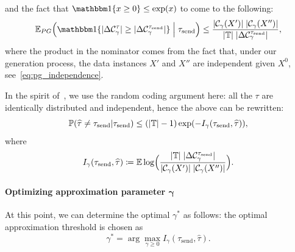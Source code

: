 and the fact that $\Ind\{x \ge 0\} \le \exp(x)$ to come to the following:
\begin{equation}
  \Expct_{PG}
      \Bigl(
        \Ind\{|\Delta \mathcal{C}_\gamma^\tau| \ge |\Delta \mathcal{C}_\gamma^{\tau_\text{send}}|\} \Bigm| \tau_\text{send}
      \Bigr)
      \le
      \frac{|\mathcal{C}_\gamma(X')| \;  |\mathcal{C}_\gamma(X'')|}%
      {|\mathbb{T}| \; |\Delta \mathcal{C}_\gamma^{\tau_\text{send}}|},
\end{equation}
where the product in the nominator comes from the fact that, under our
generation process, the data instances $X'$ and $X''$ are independent given
$X^0$, see~\eqref{eq:pg_independence}.

In the spirit of~\citet{shannon:1948}, we use the random coding argument here: 
all the $\tau$ are identically distributed and independent, hence the above can
be rewritten:
\begin{equation}
  {\mathbb{P}}(\widehat \tau \ne \tau_\text{send} | \tau_\text{send}) \le (|\mathbb{T}| - 1)
    \exp(- I_\gamma(\tau_\text{send}, \widehat \tau)),
\end{equation}
where 
\begin{equation}
  I_\gamma(\tau_\text{send}, \hat \tau) \coloneqq  \Expct \log 
  \Bigl(
    \frac{|\mathbb{T}| \; |\Delta \mathcal{C}_\gamma^{\tau_\text{send}}|}%
      {|\mathcal{C}_\gamma(X')| \;  |\mathcal{C}_\gamma(X'')|}
  \Bigr).
\end{equation}

\paragraph{Optimizing approximation parameter $\boldsymbol\gamma$}
At this point, we can determine the optimal $\gamma^*$ as follows: the optimal
approximation threshold is chosen as
\begin{equation}\label{eq:asc_best_gamma}
  \gamma^* = \arg \max_{\gamma \ge 0} I_\gamma(\tau_\text{send}, \hat \tau).
\end{equation}
%

